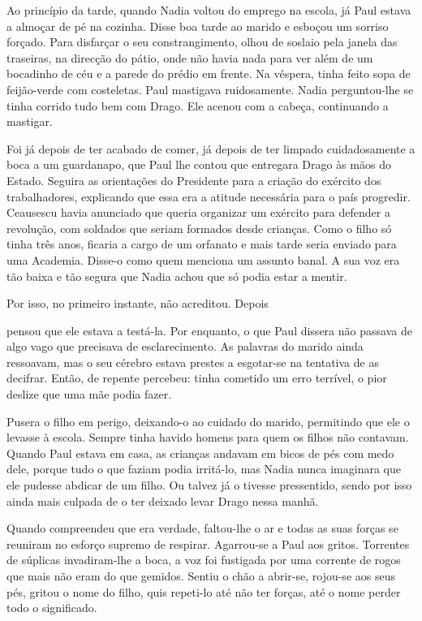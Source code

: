 Ao princípio da tarde, quando Nadia voltou do emprego na escola, já Paul
estava a almoçar de pé na cozinha. Disse boa tarde ao marido e esboçou
um sorriso forçado. Para disfarçar o seu constrangimento, olhou de
soslaio pela janela das traseiras, na direcção do pátio, onde não havia
nada para ver além de um bocadinho de céu e a parede do prédio em
frente. Na véspera, tinha feito sopa de feijão-verde com costeletas. Paul mastigava ruidosamente. Nadia perguntou-lhe
se tinha corrido tudo bem com Drago. Ele acenou com a cabeça,
continuando a mastigar.

Foi já depois de ter acabado de comer, já depois de ter limpado
cuidadosamente a boca a um guardanapo, que Paul lhe contou que entregara
Drago às mãos do Estado. Seguira as orientações do Presidente para a
criação do exército dos trabalhadores, explicando que essa era a atitude necessária para o país progredir. Ceausescu havia anunciado que
queria organizar um exército para defender a revolução, com soldados que
seriam formados desde crianças. Como o filho só tinha três anos, ficaria
a cargo de um orfanato e mais tarde seria enviado para uma Academia.
Disse-o como quem menciona um assunto banal. A sua voz era tão baixa e
tão segura que Nadia achou que só podia estar a mentir.

Por isso, no primeiro instante, não acreditou. Depois

pensou que ele estava a testá-la. Por enquanto, o que Paul dissera não
passava de algo vago que precisava de esclarecimento. As palavras do
marido ainda ressoavam, mas o seu cérebro estava prestes a esgotar-se na
tentativa de as decifrar. Então, de repente percebeu: tinha cometido um
erro terrível, o pior deslize que uma mãe podia fazer.

Pusera o filho em perigo, deixando-o ao cuidado do marido, permitindo
que ele o levasse à escola. Sempre tinha havido homens para quem os
filhos não contavam. Quando Paul estava em casa, as crianças andavam em
bicos de pés com medo dele, porque tudo o que faziam podia irritá-lo,
mas Nadia nunca imaginara que ele pudesse abdicar de um filho. Ou talvez
já o tivesse pressentido, sendo por isso ainda mais culpada de o ter
deixado levar Drago nessa manhã.

Quando compreendeu que era verdade, faltou-lhe o ar e todas as suas
forças se reuniram no esforço supremo de respirar. Agarrou-se a Paul aos
gritos. Torrentes de súplicas invadiram-lhe a boca, a voz foi fustigada
por uma corrente de rogos que mais não eram do que gemidos. Sentiu o
chão a abrir-se, rojou-se aos seus pés, gritou o nome do filho, quis
repeti-lo até não ter forças, até o nome perder todo o significado.

